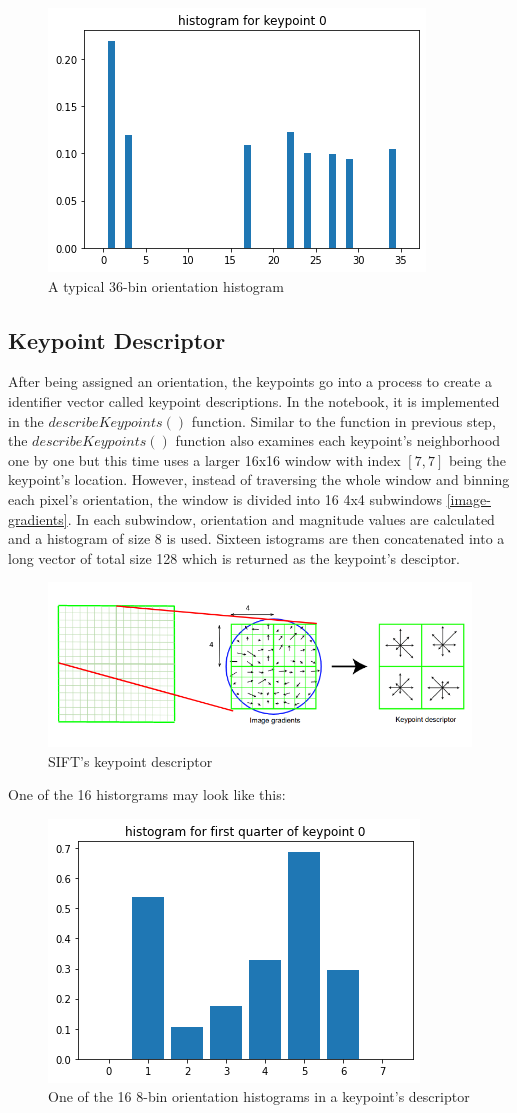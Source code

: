 \documentclass{article}
\begin{document}
\begin{multicols}{2}
	\begin{figure}
		\centering
		\includegraphics[width=0.4\linewidth]{36histogram.png}
		\caption{\label{fig:36histogram} A typical 36-bin orientation histogram}
	\end{figure}	
	
	
	\subsection{Keypoint Descriptor}
	After being assigned an orientation, the keypoints go into a process to create a identifier vector called keypoint descriptions. In the notebook, it is implemented in the $describeKeypoints()$ function. Similar to the function in previous step, the $describeKeypoints()$ function also examines each keypoint's neighborhood one by one but this time uses a larger 16x16 window with index $[7,7]$ being the keypoint's location. However, instead of traversing the whole window and binning each pixel's orientation, the window is divided into 16 4x4 subwindows \ref{image-gradients}. In each subwindow, orientation and magnitude values are calculated and a histogram of size 8 is used. Sixteen istograms are then concatenated into a long vector of total size 128 which is returned as the keypoint's desciptor.
	
	\begin{figure}
		\centering
		\includegraphics[width=0.4\linewidth]{image-gradients.png}
		\caption{\label{fig:image-gradients} SIFT's keypoint descriptor}
	\end{figure}
	
	One of the 16 historgrams may look like this:
	
	\begin{figure}
		\centering
		\includegraphics[width=0.4\linewidth]{8histogram.png}
		\caption{\label{fig:8histogram} One of the 16 8-bin orientation histograms in a keypoint's descriptor}
	\end{figure}	
	

\end{multicols}
\end{document}
